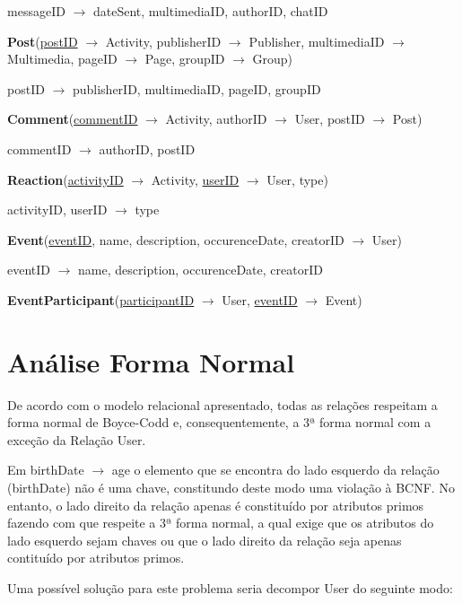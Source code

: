 \documentclass[12pt]{report}
\begin{document}
messageID $\rightarrow$ dateSent, multimediaID, authorID, chatID

\vspace{2mm}

\textbf{Post}(\underline{postID} $\rightarrow$ Activity, publisherID $\rightarrow$ Publisher, multimediaID $\rightarrow$ Multimedia, pageID $\rightarrow$ Page, groupID $\rightarrow$ Group)

postID $\rightarrow$ publisherID, multimediaID, pageID, groupID

\vspace{2mm}

\textbf{Comment}(\underline{commentID} $\rightarrow$ Activity, authorID $\rightarrow$ User, postID $\rightarrow$ Post)

commentID $\rightarrow$ authorID, postID

\vspace{2mm}

\textbf{Reaction}(\underline{activityID} $\rightarrow$ Activity, \underline{userID} $\rightarrow$ User, type)

activityID, userID $\rightarrow$ type

\vspace{2mm}

\textbf{Event}(\underline{eventID}, name, description, occurenceDate, creatorID $\rightarrow$ User)

eventID $\rightarrow$ name, description, occurenceDate, creatorID

\vspace{2mm}

\textbf{EventParticipant}(\underline{participantID} $\rightarrow$ User, \underline{eventID} $\rightarrow$ Event)

\pagebreak

\section{Análise Forma Normal}

De acordo com o modelo relacional apresentado, todas as relações respeitam a forma normal de Boyce-Codd e,  consequentemente, a 3ª forma normal com a exceção da Relação User. \par
Em birthDate $\rightarrow$ age o elemento que se encontra do lado esquerdo da relação (birthDate) não é uma chave, constitundo deste modo uma violação à BCNF. No entanto, o lado direito da relação apenas é constituído por atributos primos fazendo com que respeite a 3ª forma normal, a qual exige que os atributos do lado esquerdo sejam chaves ou que o lado direito da relação seja apenas contituído por atributos primos. \par
Uma possível solução para este problema seria decompor User do seguinte modo:
\end{document}
